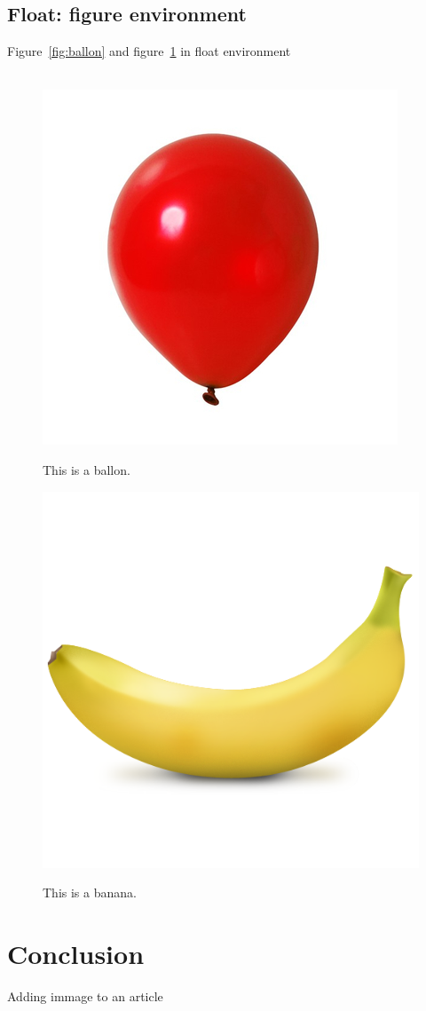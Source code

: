 \documentclass{article}
\begin{document}
        \subsection{Float: figure environment}
            Figure~\ref{fig:ballon} and figure~\ref{fig:banana} in float environment\\
            \vspace{1cm}\\
            \begin{figure}[htbp]
                \begin{center}
                    \includegraphics[scale=0.1]{ballon.jpg}
                    \caption{This is a ballon.}
                    \label{fig:ballon}
                    \includegraphics[scale=0.1]{banana.png}
                    \caption{This is a banana.}
                    \label{fig:banana}
                \end{center}
            \end{figure}
    \section{Conclusion}
            Adding immage to an article
\end{document}
